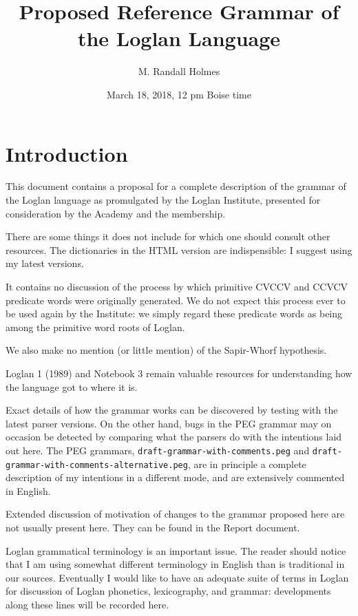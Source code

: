 \documentclass[12pt]{book}
\title{Proposed Reference Grammar of the Loglan Language}
\author{M. Randall Holmes}
\date{March 18, 2018, 12  pm Boise time}
\begin{document}
\maketitle

\tableofcontents

\chapter{Introduction}

This document contains a proposal for a complete description of the grammar of the Loglan language as promulgated by the Loglan Institute, presented
for consideration by the Academy and the membership.

There are some things it does not include for which one should consult other resources.  The dictionaries in the HTML version are indispensible:  I suggest using my latest versions.

It contains no discussion of the process by which primitive CVCCV and CCVCV predicate words were originally generated.  We do not expect this process ever to be used again by the Institute:  we simply regard these predicate words as being among the primitive word roots of Loglan.

We also make no mention (or little mention) of the Sapir-Whorf hypothesis.

Loglan 1 (1989) and Notebook 3 remain valuable resources for understanding how the language got to where it is.

Exact details of how the grammar works can be discovered by testing with the latest parser versions.  On the other hand, bugs in the PEG grammar may on occasion be detected by comparing what the parsers do with the intentions laid out here.  The PEG grammars, {\tt draft-grammar-with-comments.peg} and {\tt draft-grammar-with-comments-alternative.peg}, are in principle a complete description of my intentions in a different mode, and are extensively commented in English.

Extended discussion of motivation of changes to the grammar proposed here are not usually present here.  They can be found in the Report document.

Loglan grammatical terminology is an important issue.  The reader should notice that I am using somewhat different terminology in English than is traditional in our sources.  Eventually I would like to have an adequate suite of terms in Loglan for discussion of Loglan phonetics, lexicography, and grammar:  developments along these lines will be recorded here.
\end{document}
